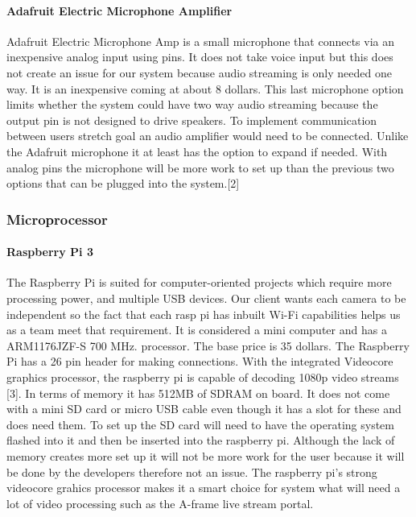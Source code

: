 \documentclass[onecolumn, draftclsnofoot,10pt, compsoc]{IEEEtran}
\begin{document}
            \paragraph{Adafruit Electric Microphone Amplifier }Adafruit Electric Microphone Amp is a small microphone that connects via an inexpensive analog input using pins. It does not take voice input but this does not create an issue for our system because audio streaming is only needed one way. It is an inexpensive coming at about 8 dollars. This last microphone option limits whether the system could have two way audio streaming because the output pin is not designed to drive speakers. To implement communication between users stretch goal an audio amplifier would need to be connected. Unlike the Adafruit microphone it at least has the option to expand if needed. With analog pins the microphone will be more work to set up than the previous two options that can be plugged into the system.[2]

        \subsubsection{Microprocessor}
            \paragraph{Raspberry Pi 3}
            The Raspberry Pi is suited for computer-oriented projects which require more processing power, and multiple USB devices. Our client wants each camera to be independent so the fact that each rasp pi has inbuilt Wi-Fi capabilities helps us as a team meet that requirement. It is considered a mini computer and has a ARM1176JZF-S 700 MHz. processor. The base price is 35 dollars. The Raspberry Pi has a 26 pin header for making connections. With the integrated Videocore graphics processor, the raspberry pi is capable of decoding 1080p video streams [3]. In terms of memory it has 512MB of SDRAM on board. It does not come with a mini SD card or micro USB cable even though it has a slot for these and does need them. To set up the SD card will need to have the operating system flashed into it and then be inserted into the raspberry pi. Although the lack of memory creates more set up it will not be more work for the user because it will be done by the developers therefore not an issue. The raspberry pi's strong videocore grahics processor makes it a smart choice for system what will need a lot of video processing such as the A-frame live stream portal.  
    
\end{document}
